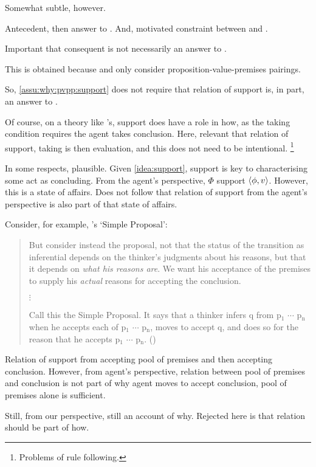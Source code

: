 \begin{note}
  Somewhat subtle, however.

  Antecedent, then answer to \qWhy{}.
  And, motivated constraint between \qWhy{} and \qHow{}.

  Important that consequent is not necessarily an answer to \qHow{}.

  This is obtained because \qWhy{} and \qHow{} only consider proposition-value-premises pairings.

  So, \autoref{assu:why:pvpp:support} does not require that relation of support is, in part, an answer to \qHow{}.

  Of course, on a theory like \citeauthor{Boghossian:2014aa}'s, support does have a role in how, as the taking condition requires the agent takes conclusion.
  Here, relevant that relation of support, taking is then evaluation, and this does not need to be intentional.%
  \footnote{
    Problems of rule following.
  }

  In some respects, plausible.
  Given \autoref{idea:support}, support is key to characterising some act as concluding.
  From the agent's perspective, \(\Phi\) support \(\langle \phi, v \rangle\).
  However, this is a state of affairs.
  Does not follow that relation of support from the agent's perspective is also part of that state of affairs.

  Consider, for example, \citeauthor{Wright:2014tt}'s `Simple Proposal':
  \begin{quote}
    But consider instead the proposal, not that the status of the transition as inferential depends on the thinker's judgments about his reasons, but that it depends on \emph{what his reasons are}.
    We want his acceptance of the premises to supply his \emph{actual} reasons for accepting the conclusion.

    \mbox{}\hfill\(\vdots\)\hfill\mbox{}

    Call this the Simple Proposal.
    It says that a thinker infers q from p\(_{1}\) \(\cdots\) p\(_{\text{n}}\) when he accepts each of p\(_{1}\) \(\cdots\) p\(_{\text{n}}\), moves to accept q, and does so for the reason that he accepts p\(_{1}\) \(\cdots\) p\(_{\text{n}}\).\newline
    \mbox{}\hfill\mbox{(\Citeyear[33]{Wright:2014tt})}
  \end{quote}

  Relation of support from accepting pool of premises and then accepting conclusion.
  However, from agent's perspective, relation between pool of premises and conclusion is not part of why agent moves to accept conclusion, pool of premises alone is sufficient.

  Still, from our perspective, still an account of why.
  Rejected here is that relation should be part of how.
\end{note}

